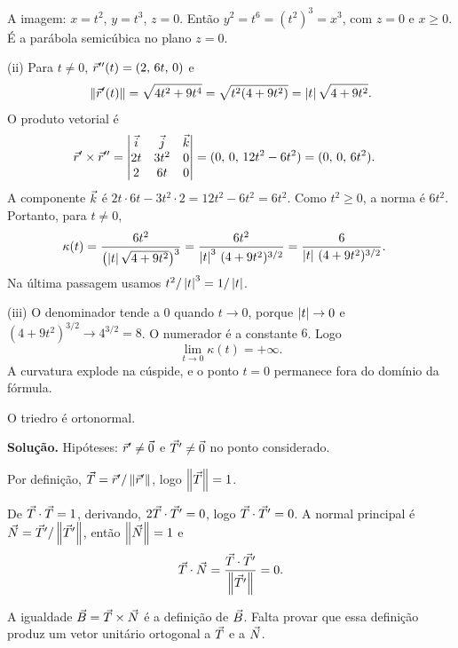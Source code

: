 \documentclass[11pt,a4paper]{article}
\begin{document}
A imagem: \(x=t^{2}\), \(y=t^{3}\), \(z=0\). Então \(y^{2}=t^{6}=(t^{2})^{3}=x^{3}\), com \(z=0\) e \(x\ge 0\). É a parábola semicúbica no plano \(z=0\).

(ii) Para \(t\neq 0\), \(\vec{r}''(t)=(2,\,6t,\,0)\) e
\[
\left\lVert \vec{r}'(t) \right\rVert
=\sqrt{4t^{2}+9t^{4}}
=\sqrt{t^{2}(4+9t^{2})}
=\left\lvert t \right\rvert\sqrt{4+9t^{2}}.
\]
O produto vetorial é
\begin{align*}
\vec{r}'\times\vec{r}''
&=
\begin{vmatrix}
\vec{i}&\vec{j}&\vec{k}\\
2t&3t^{2}&0\\
2&6t&0
\end{vmatrix}
=(0,\,0,\,12t^{2}-6t^{2})
=(0,\,0,\,6t^{2}).
\end{align*}
A componente \(\vec{k}\) é \(2t\cdot 6t-3t^{2}\cdot 2=12t^{2}-6t^{2}=6t^{2}\). Como \(t^{2}\ge 0\), a norma é \(6t^{2}\). Portanto, para \(t\neq 0\),
\begin{align*}
\kappa(t)
&=\frac{6t^{2}}{\bigl(\left\lvert t \right\rvert\sqrt{4+9t^{2}}\bigr)^{3}}
=\frac{6t^{2}}{\left\lvert t \right\rvert^{3}\,(4+9t^{2})^{3/2}}
=\frac{6}{\left\lvert t \right\rvert\,(4+9t^{2})^{3/2}}.
\end{align*}
Na última passagem usamos \(t^{2}/\left\lvert t \right\rvert^{3}=1/\left\lvert t \right\rvert\).

(iii) O denominador tende a \(0\) quando \(t\to 0\), porque \(\left\lvert t \right\rvert\to 0\) e \((4+9t^{2})^{3/2}\to 4^{3/2}=8\). O numerador é a constante \(6\). Logo
\[
\lim_{t\to 0}\kappa(t)=+\infty.
\]
A curvatura explode na cúspide, e o ponto \(t=0\) permanece fora do domínio da fórmula.

\begin{exercicio}[Avançado --- A3]
O triedro é ortonormal.
\end{exercicio}

\noindent\textbf{Solução.}
Hipóteses: \(\vec{r}'\neq\vec{0}\) e \(\vec{T}'\neq\vec{0}\) no ponto considerado.

Por definição, \(\vec{T}=\vec{r}'/\left\lVert \vec{r}' \right\rVert\), logo \(\left\lVert \vec{T} \right\rVert=1\).

De \(\vec{T}\cdot\vec{T}=1\), derivando, \(2\vec{T}\cdot\vec{T}'=0\), logo \(\vec{T}\cdot\vec{T}'=0\). A normal principal é \(\vec{N}=\vec{T}'/\left\lVert \vec{T}' \right\rVert\), então \(\left\lVert \vec{N} \right\rVert=1\) e
\[
\vec{T}\cdot\vec{N}
=\frac{\vec{T}\cdot\vec{T}'}{\left\lVert \vec{T}' \right\rVert}=0.
\]

A igualdade \(\vec{B}=\vec{T}\times\vec{N}\) é a definição de \(\vec{B}\). Falta provar que essa definição produz um vetor unitário ortogonal a \(\vec{T}\) e a \(\vec{N}\).
\end{document}
